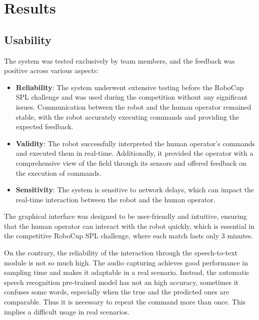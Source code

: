 \documentclass[a4paper, onecolumn, 12pt]{article}
\begin{document}
\section{Results}
\label{sec:res}
\subsection{Usability}  
The system was tested exclusively by team members, and the feedback was positive 
across various aspects:  
\begin{itemize}  
    \item \textbf{Reliability}: The system underwent extensive testing before the RoboCup 
    SPL challenge and was used during the competition without any significant issues. 
    Communication between the robot and the human operator remained stable, with the 
    robot accurately executing commands and providing the expected feedback.  
    \item \textbf{Validity}: The robot successfully interpreted the human operator's 
    commands and executed them in real-time. Additionally, it provided the operator with a comprehensive view of the field through its sensors and offered feedback on the execution of commands.  
    \item \textbf{Sensitivity}: The system is sensitive to network delays, which can 
    impact the real-time interaction between the robot and the human operator.  
\end{itemize}  

The graphical interface was designed to be user-friendly and intuitive, ensuring that 
the human operator can interact with the robot quickly, which is essential in the 
competitive RoboCup SPL challenge, where each match lasts only 3 minutes. 

On the contrary, the reliability of the interaction through the speech-to-text module 
is not so much high. The audio capturing achieves 
good performance in sampling time and makes it adaptable in a real scenario.
Instead, the automatic speech recognition pre-trained model has not an high accuracy,
sometimes it confuses some words, especially when the true
and the predicted ones are comparable. Thus it is necessary to repeat the command more than once.
This implies a difficult usage in real scenarios.
\end{document}
